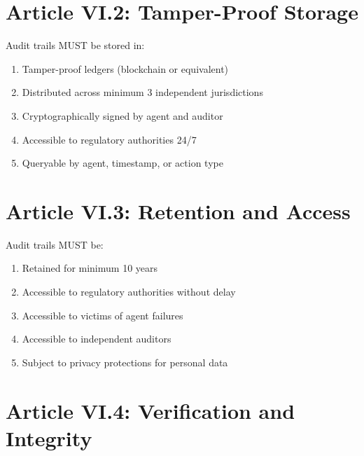 \vspace{0.5cm}

\section{Article VI.2: Tamper-Proof Storage}

\begin{articlebox}
Audit trails MUST be stored in:
\begin{enumerate}
    \item Tamper-proof ledgers (blockchain or equivalent)
    \item Distributed across minimum 3 independent jurisdictions
    \item Cryptographically signed by agent and auditor
    \item Accessible to regulatory authorities 24/7
    \item Queryable by agent, timestamp, or action type
\end{enumerate}
\end{articlebox}

\vspace{0.5cm}

\section{Article VI.3: Retention and Access}

\begin{articlebox}
Audit trails MUST be:
\begin{enumerate}
    \item Retained for minimum 10 years
    \item Accessible to regulatory authorities without delay
    \item Accessible to victims of agent failures
    \item Accessible to independent auditors
    \item Subject to privacy protections for personal data
\end{enumerate}
\end{articlebox}

\vspace{0.5cm}

\section{Article VI.4: Verification and Integrity}

